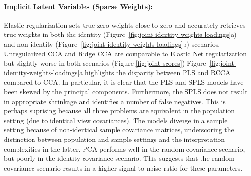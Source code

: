 \paragraph{Implicit Latent Variables (Sparse Weights):} Elastic regularization sets true zero weights close to zero and accurately retrieves true weights in both the identity (Figure~\ref{fig:joint-identity-weights-loadings}a) and non-identity (Figure~\ref{fig:joint-identity-weights-loadings}b) scenarios.
Unregularized CCA and Ridge CCA are comparable to Elastic Net regularization but slightly worse in both scenarios (Figure \ref{fig:joint-scores})
Figure~\ref{fig:joint-identity-weights-loadings}a highlights the disparity between PLS and RCCA compared to CCA.
In particular, it is clear that the PLS and SPLS models have been skewed by the principal components.
Furthermore, the SPLS does not result in appropriate shrinkage and identifies a number of false negatives.
This is perhaps suprising because all three problems are equivalent in the population setting (due to identical view covariances).
The models diverge in a sample setting because of non-identical sample covariance matrices, underscoring the distinction between population and sample settings and the interpretation complexities in the latter.
PCA performs well in the random covariance scenario, but poorly in the identity covariance scenario.
This suggests that the random covariance scenario results in a higher signal-to-noise ratio for these parameters.

